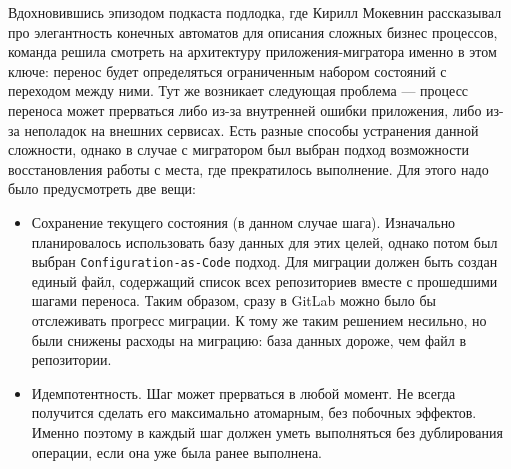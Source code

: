 Вдохновившись эпизодом\cite{podlodka-podcast} подкаста подлодка,
где Кирилл Мокевнин рассказывал про элегантность конечных автоматов\cite{fsm} для описания сложных бизнес процессов,
команда решила смотреть на архитектуру приложения-мигратора именно в этом ключе:
перенос будет определяться ограниченным набором состояний с переходом между ними.
Тут же возникает следующая проблема — процесс переноса может прерваться либо из-за внутренней ошибки приложения, либо из-за неполадок на внешних сервисах.
Есть разные способы устранения данной сложности, однако в случае с мигратором был выбран подход возможности восстановления работы с места, где прекратилось выполнение.
Для этого надо было предусмотреть две вещи:
\begin{itemize}
  \item Сохранение текущего состояния (в данном случае шага).
        Изначально планировалось использовать базу данных для этих целей, однако потом был выбран \texttt{Configuration-as-Code} подход\cite{cac}.
        Для миграции должен быть создан единый файл, содержащий список всех репозиториев вместе с прошедшими шагами переноса.
        Таким образом, сразу в GitLab можно было бы отслеживать прогресс миграции.
        К тому же таким решением несильно, но были снижены расходы на миграцию: база данных дороже, чем файл в репозитории.
  \item Идемпотентность\cite{idempotence}.
        Шаг может прерваться в любой момент.
        Не всегда получится сделать его максимально атомарным, без побочных эффектов.
        Именно поэтому в каждый шаг должен уметь выполняться без дублирования операции, если она уже была ранее выполнена.
\end{itemize}
